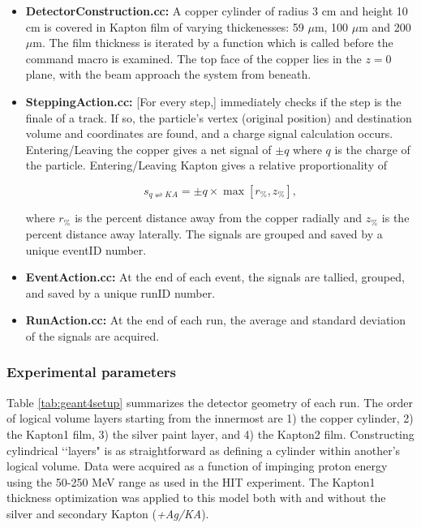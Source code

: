 \documentclass{mc2015}
\begin{document}
\begin{itemize}
\item \textbf{DetectorConstruction.cc:} A copper cylinder of radius 3 cm and height 10 cm is covered in Kapton film of varying thickenesses: 59 $\mu$m, 100 $\mu$m and 200 $\mu$m.  The film thickness is iterated by a function which is called before the command macro is examined.  The top face of the copper lies in the $z=0$ plane, with the beam approach the system from beneath.
\item \textbf{SteppingAction.cc:} [For every step,] immediately checks if the step is the finale of a track.  If so, the particle's vertex (original position) and destination volume and coordinates are found, and a charge signal calculation occurs.  Entering/Leaving the copper gives a net signal of $\pm q$ where $q$ is the charge of the particle.  Entering/Leaving Kapton gives a relative proportionality of

\begin{equation}
s_{q\rightleftharpoons KA} = \pm q\times\max\left[r_{\%}, z_{\%}\right], \label{eqn:s_KA}
\end{equation}

where $r_{\%}$ is the percent distance away from the copper radially and $z_{\%}$ is the percent distance away laterally.  The signals are grouped and saved by a unique eventID number.
\item \textbf{EventAction.cc:} At the end of each event, the signals are tallied, grouped, and saved by a unique runID number.
\item \textbf{RunAction.cc:} At the end of each run, the average and standard deviation of the signals are acquired.
\end{itemize}

\subsubsection{Experimental parameters}

Table \ref{tab:geant4setup} summarizes the detector geometry of each run.  The order of logical volume layers starting from the innermost are 1) the copper cylinder, 2) the Kapton1 film, 3) the silver paint layer, and 4) the Kapton2 film.  Constructing cylindrical \lq\lq layers" is as straightforward as defining a cylinder within another's logical volume.  Data were acquired as a function of impinging proton energy using the 50-250 MeV range as used in the HIT experiment.  The Kapton1 thickness optimization was applied to this model both with and without the silver and secondary Kapton (\emph{+Ag/KA}).
\end{document}
